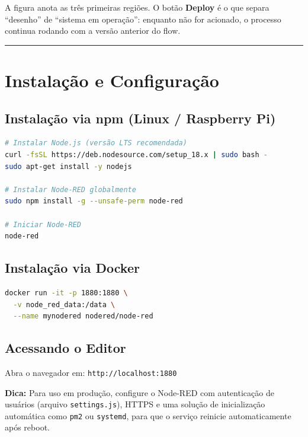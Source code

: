 A figura anota as três primeiras regiões. O botão \textbf{Deploy} é o que separa ``desenho'' de
``sistema em operação'': enquanto não for acionado, o processo continua rodando com a versão
anterior do flow.

\begin{center}\rule{0.5\linewidth}{0.5pt}\end{center}

\section{Instalação e Configuração}\label{instalauxe7uxe3o-e-configurauxe7uxe3o}

\subsection{Instalação via npm (Linux / Raspberry Pi)}\label{instalauxe7uxe3o-via-npm-linux-raspberry-pi}

\begin{lstlisting}[language=bash]
# Instalar Node.js (versão LTS recomendada)
curl -fsSL https://deb.nodesource.com/setup_18.x | sudo bash -
sudo apt-get install -y nodejs

# Instalar Node-RED globalmente
sudo npm install -g --unsafe-perm node-red

# Iniciar Node-RED
node-red
\end{lstlisting}

\subsection{Instalação via Docker}\label{instalauxe7uxe3o-via-docker}

\begin{lstlisting}[language=bash]
docker run -it -p 1880:1880 \
  -v node_red_data:/data \
  --name mynodered nodered/node-red
\end{lstlisting}

\subsection{Acessando o Editor}\label{acessando-o-editor}

Abra o navegador em: \passthrough{\lstinline!http://localhost:1880!}

\begin{caixadica}

\textbf{Dica:} Para uso em produção, configure o Node-RED com autenticação de usuários (arquivo \passthrough{\lstinline!settings.js!}), HTTPS e uma solução de inicialização automática como \passthrough{\lstinline!pm2!} ou \passthrough{\lstinline!systemd!}, para que o serviço reinicie automaticamente após reboot.

\end{caixadica}

